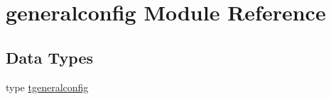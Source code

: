 \hypertarget{namespacegeneralconfig}{}\section{generalconfig Module Reference}
\label{namespacegeneralconfig}
\subsection*{Data Types}
\begin{DoxyCompactItemize}
\item 
type \mbox{\hyperlink{structgeneralconfig_1_1tgeneralconfig}{tgeneralconfig}}
\end{DoxyCompactItemize}
